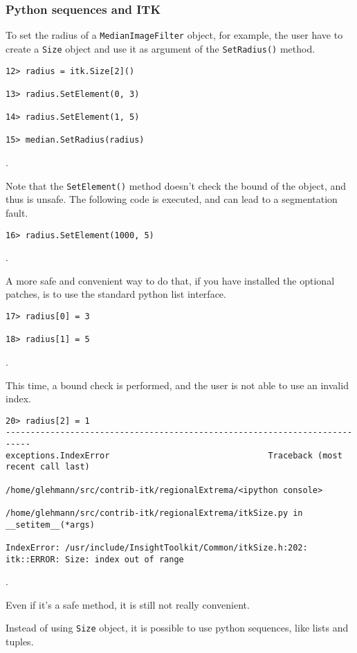 \documentclass{InsightArticle}
\begin{document}
     \subsubsection{Python sequences and ITK}

To set the radius of a \verb$MedianImageFilter$ object, for example, the user have to
create a \verb$Size$ object and use it as argument of the \verb$SetRadius()$ method.
\begin{verbatim}
12> radius = itk.Size[2]()

13> radius.SetElement(0, 3)

14> radius.SetElement(1, 5)

15> median.SetRadius(radius)
\end{verbatim}.

Note that the \verb$SetElement()$ method doesn't check the bound of the object, and thus
is unsafe. The following code is executed, and can lead to a segmentation fault.

\begin{verbatim}
16> radius.SetElement(1000, 5)
\end{verbatim}.

A more safe and convenient way to do that, if you have installed the optional patches,
is to use the standard python list interface.

\begin{verbatim}
17> radius[0] = 3

18> radius[1] = 5
\end{verbatim}.

This time, a bound check is performed, and the user is not able to use an invalid index.

\begin{verbatim}
20> radius[2] = 1
---------------------------------------------------------------------------
exceptions.IndexError                                Traceback (most recent call last)

/home/glehmann/src/contrib-itk/regionalExtrema/<ipython console>

/home/glehmann/src/contrib-itk/regionalExtrema/itkSize.py in __setitem__(*args)

IndexError: /usr/include/InsightToolkit/Common/itkSize.h:202:
itk::ERROR: Size: index out of range
\end{verbatim}.

Even if it's a safe method, it is still not really convenient.

Instead of using \verb$Size$ object, it is possible to use python sequences, like lists
and tuples.
\end{document}
